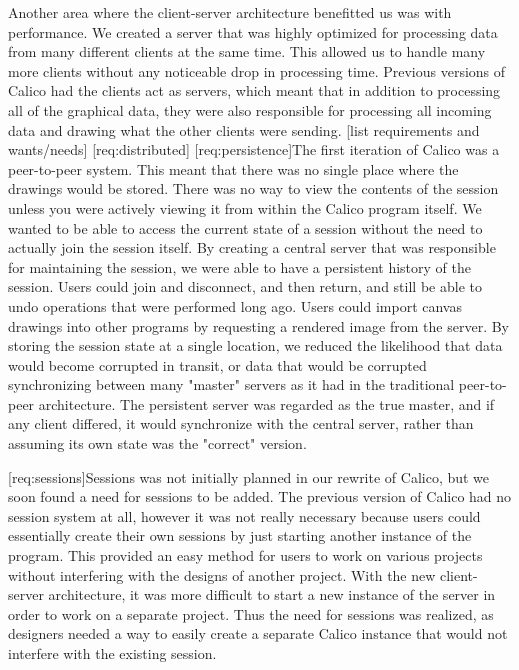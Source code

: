 Another area where the client-server architecture benefitted us was with performance. We created a server that was highly optimized for processing data from many different clients at the same time. This allowed us to handle many more clients without any noticeable drop in processing time. Previous versions of Calico had the clients act as servers, which meant that in addition to processing all of the graphical data, they were also responsible for processing all incoming data and drawing what the other clients were sending.
[list requirements and wants/needs]
[req:distributed]
[req:persistence]The first iteration of Calico was a peer-to-peer system. This meant that there was no single place where the drawings would be stored. There was no way to view the contents of the session unless you were actively viewing it from within the Calico program itself. We wanted to be able to access the current state of a session without the need to actually join the session itself. By creating a central server that was responsible for maintaining the session, we were able to have a persistent history of the session. Users could join and disconnect, and then return, and still be able to undo operations that were performed long ago. Users could import canvas drawings into other programs by requesting a rendered image from the server. By storing the session state at a single location, we reduced the likelihood that data would become corrupted in transit, or data that would be corrupted synchronizing between many "master" servers as it had in the traditional peer-to-peer architecture. The persistent server was regarded as the true master, and if any client differed, it would synchronize with the central server, rather than assuming its own state was the "correct" version.

[req:sessions]Sessions was not initially planned in our rewrite of Calico, but we soon found a need for sessions to be added. The previous version of Calico had no session system at all, however it was not really necessary because users could essentially create their own sessions by just starting another instance of the program. This provided an easy method for users to work on various projects without interfering with the designs of another project. With the new client-server architecture, it was more difficult to start a new instance of the server in order to work on a separate project. Thus the need for sessions was realized, as designers needed a way to easily create a separate Calico instance that would not interfere with the existing session. 

